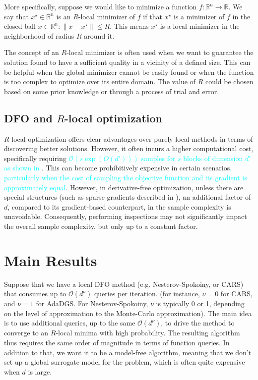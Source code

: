 \documentclass[sn-mathphys,Numbered]{sn-jnl}
\theoremstyle{thmstyleone}
\theoremstyle{thmstyletwo}
\theoremstyle{thmstylethree}
\newcommand{\BK}[1]{{\textcolor{cyan}{#1}}}
\begin{document}
More specifically, suppose we would like to minimize a function $f: \mathbb{R}^n \rightarrow \mathbb{R}$. We say that $x^\star\in\mathbb{R}^n$ is an $R$-local minimizer of $f$ if  that $x^\star$ is a  minimizer of $f$ in the closed ball ${x \in \mathbb{R}^n: \|x - x^\star\| \leq R}$.
This means $x^\star$ is a local minimizer in the neighborhood of radius $R$ around it. 

The concept of an $R$-local minimizer is often used when we want to guarantee the solution found to have a sufficient quality in a vicinity of a defined size. This can be helpful when the global minimizer cannot be easily found or when the function is too complex to optimize over its entire domain. The value of $R$ could be chosen based on some prior knowledge or through a process of trial and error.

\subsection{DFO and $R$-local optimization}
$R$-local optimization offers clear advantages over purely local methods in terms of discovering better solutions. However, it often incurs a higher computational cost, specifically requiring \BK{$\mathcal{O}(s \exp({O(d')}))$ samples for $s$ blocks of dimension $d'$ as shown in \cite{chen2019run}}.
This can become prohibitively expensive in certain scenarios\BK{, particularly when the cost of sampling the objective function and its gradient is approximately equal}. However, in derivative-free optimization, unless there are special structures (such as sparse gradients described in \cite{cai2020zeroth}), an additional factor of $d$, compared to its gradient-based counterpart, in the sample complexity is unavoidable. Consequently, performing inspections may not significantly impact the overall sample complexity, but only up to a constant factor.

\section{Main Results}
Suppose that we have a local DFO method (e.g. Nesterov-Spokoiny\cite{nesterov2017random}, or CARS\cite{kim2021curvature}) that consumes up to $\mathcal{O}(d^\nu)$ queries per iteration. (for instance, $\nu = 0$ for CARS, and $\nu=1$ for AdaDGS. For Nesterov-Spokoiny, $\nu$ is typically 0 or 1, depending on the level of approximation to the Monte-Carlo approximation).
The main idea is to use additional queries, up to the same $\mathcal{O}(d^\nu)$, to drive the method to converge to an $R$-local minima with high probability. The resulting algorithm thus requires the same order of magnitude in terms of function queries.
In addition to that, we want it to be a model-free algorithm, meaning that we don't set up a global surrogate model for the problem, which is often quite expensive when $d$ is large.
\end{document}
